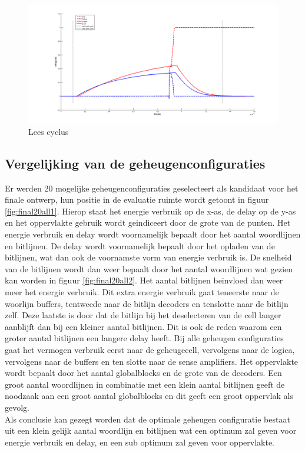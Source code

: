 \begin{figure}[!ht]
  \centering
  \includegraphics[scale=0.6]{../fig/hfdstk-timing-leescyclus.png}
  \caption{Lees cyclus}
  \label{fig:leescyclus}
\end{figure} 

\subsection{Vergelijking van de geheugenconfiguraties}
Er werden 20 mogelijke geheugenconfiguraties geselecteert als kandidaat voor het finale ontwerp, hun positie in de evaluatie ruimte wordt getoont in figuur \ref{fig:final20all1}. Hierop staat het energie verbruik op de x-as, de delay op de y-as en het oppervlakte gebruik wordt geindiceert door de grote van de punten. Het energie verbruik en delay wordt voornamelijk bepaalt door het aantal woordlijnen en bitlijnen. De delay wordt voornamelijk bepaalt door het opladen van de bitlijnen, wat dan ook de voornamste vorm van energie verbruik is. De snelheid van de bitlijnen wordt dan weer bepaalt door het aantal woordlijnen wat gezien kan worden in figuur \ref{fig:final20all2}. Het aantal bitlijnen beinvloed dan weer meer het energie verbruik. Dit extra energie verbruik gaat teneerste naar de woorlijn buffers, tentweede naar de bitlijn decoders en tenslotte naar de bitlijn zelf. Deze laatste is door dat de bitlijn bij het deselecteren van de cell langer aanblijft dan bij een kleiner aantal bitlijnen. Dit is ook de reden waarom een groter aantal bitlijnen een langere delay heeft. Bij alle geheugen configuraties gaat het vermogen verbruik eerst naar de geheugecell, vervolgens naar de logica, vervolgens naar de buffers en ten slotte naar de sense amplifiers. Het oppervlakte wordt bepaalt door het aantal globalblocks en de grote van de decoders. Een groot aantal woordlijnen in combinatie met een klein aantal bitlijnen geeft de noodzaak aan een groot aantal globalblocks en dit geeft een groot oppervlak als gevolg.\\
Als conclusie kan gezegt worden dat de optimale geheugen configuratie bestaat uit een klein gelijk aantal woordlijn en bitlijnen wat een optimum zal geven voor energie verbruik en delay, en een sub optimum zal geven voor oppervlakte.

